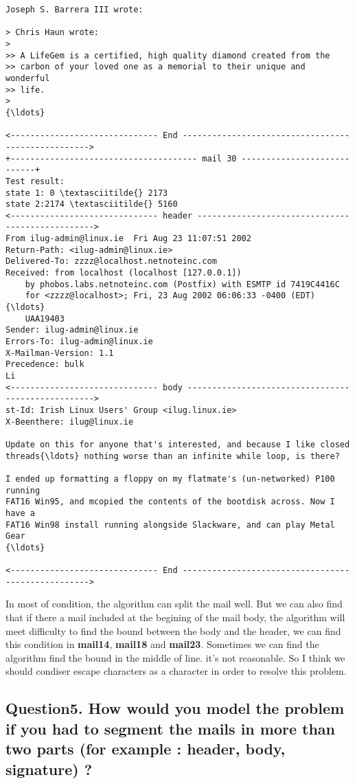 \documentclass[11pt]{article}
\begin{document}
\begin{Verbatim}[commandchars=\\\{\}]
Joseph S. Barrera III wrote:

> Chris Haun wrote:
>
>> A LifeGem is a certified, high quality diamond created from the 
>> carbon of your loved one as a memorial to their unique and wonderful 
>> life.
>
{\ldots}

<------------------------------ End --------------------------------------------------->
+-------------------------------------- mail 30 ----------------------------+
Test result:
state 1: 0 \textasciitilde{} 2173
state 2:2174 \textasciitilde{} 5160
<------------------------------ header ------------------------------------------------->
From ilug-admin@linux.ie  Fri Aug 23 11:07:51 2002
Return-Path: <ilug-admin@linux.ie>
Delivered-To: zzzz@localhost.netnoteinc.com
Received: from localhost (localhost [127.0.0.1])
	by phobos.labs.netnoteinc.com (Postfix) with ESMTP id 7419C4416C
	for <zzzz@localhost>; Fri, 23 Aug 2002 06:06:33 -0400 (EDT)
{\ldots}
    UAA19403
Sender: ilug-admin@linux.ie
Errors-To: ilug-admin@linux.ie
X-Mailman-Version: 1.1
Precedence: bulk
Li
<------------------------------ body --------------------------------------------------->
st-Id: Irish Linux Users' Group <ilug.linux.ie>
X-Beenthere: ilug@linux.ie

Update on this for anyone that's interested, and because I like closed 
threads{\ldots} nothing worse than an infinite while loop, is there?

I ended up formatting a floppy on my flatmate's (un-networked) P100 running 
FAT16 Win95, and mcopied the contents of the bootdisk across. Now I have a 
FAT16 Win98 install running alongside Slackware, and can play Metal Gear 
{\ldots}

<------------------------------ End --------------------------------------------------->

    \end{Verbatim}

    In most of condition, the algorithm can split the mail well. But we can
also find that if there a mail included at the begining of the mail
body, the algorithm will meet difficulty to find the bound between the
body and the header, we can find this condition in \textbf{mail14},
\textbf{mail18} and \textbf{mail23}. Sometimes we can find the algorithm
find the bound in the middle of line. it's not reasonable. So I think we
should condiser escape characters as a character in order to resolve
this problem.

    \subsection{Question5. How would you model the problem if you had to
segment the mails in more than two parts (for example : header, body,
signature)
?}\label{question5.-how-would-you-model-the-problem-if-you-had-to-segment-the-mails-in-more-than-two-parts-for-example-header-body-signature}
\end{document}
